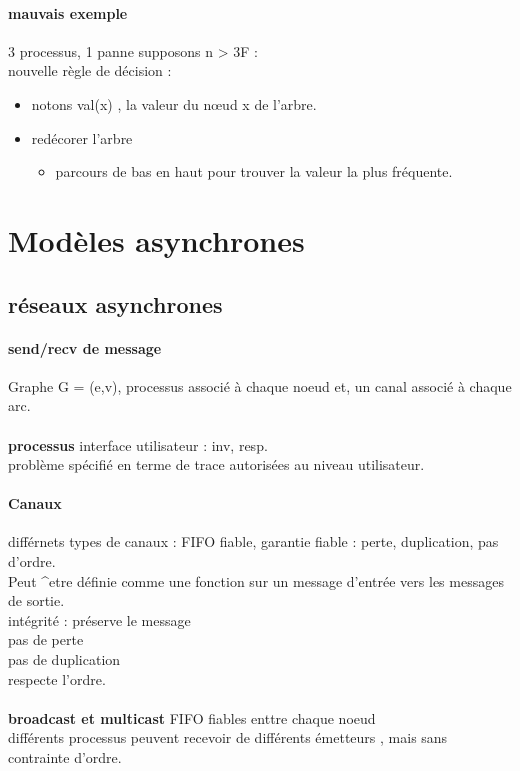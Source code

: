 \documentclass{article}
\begin{document}
\paragraph{mauvais exemple} 3 processus, 1 panne
supposons n > 3F : \\nouvelle règle de décision : 
\begin{itemize}
\item notons val(x) , la valeur du nœud x de l'arbre.
\item redécorer l'arbre 
\begin{itemize}
\item parcours de bas en haut pour trouver la valeur la plus fréquente.
\end{itemize}
\end{itemize}
\newpage
\date{18 Février 2013}
\section{Modèles asynchrones}
\subsection{réseaux asynchrones}
\paragraph{send/recv de  message}
Graphe G = (e,v), processus associé à chaque noeud et, un canal associé à chaque arc.\\\\\textbf{processus} interface utilisateur : inv, resp.\\problème spécifié en terme de trace autorisées au niveau utilisateur.
\paragraph{Canaux} différnets types de canaux : FIFO fiable, garantie fiable : perte, duplication, pas d'ordre.\\Peut ^etre définie comme une fonction sur un message d'entrée vers les messages de sortie. \\intégrité : préserve le message\\pas de perte\\pas de duplication\\respecte l'ordre.\\\\\textbf{broadcast et multicast} FIFO fiables enttre chaque noeud\\différents processus peuvent recevoir de différents émetteurs , mais sans contrainte d'ordre.
\end{document}
